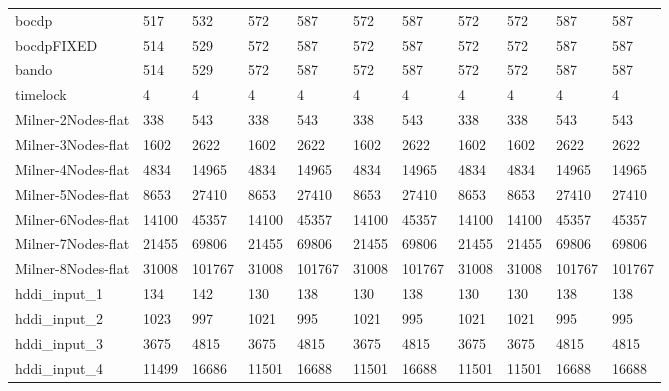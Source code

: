 \begin{table}
\begin{adjustbox}{max totalheight=\textheight}
\begin{tabular}{|l|llllllllll|}
    bocdp              & 517      & 532      & 572      & 587      & 572      & 587      & 572      & 572      & 587      & 587      \\
    bocdpFIXED         & 514      & 529      & 572      & 587      & 572      & 587      & 572      & 572      & 587      & 587      \\
    bando              & 514      & 529      & 572      & 587      & 572      & 587      & 572      & 572      & 587      & 587      \\
    timelock           & 4        & 4        & 4        & 4        & 4        & 4        & 4        & 4        & 4        & 4        \\ \hline
    Milner-2Nodes-flat & 338      & 543      & 338      & 543      & 338      & 543      & 338      & 338      & 543      & 543      \\
    Milner-3Nodes-flat & 1602     & 2622     & 1602     & 2622     & 1602     & 2622     & 1602     & 1602     & 2622     & 2622     \\
    Milner-4Nodes-flat & 4834     & 14965    & 4834     & 14965    & 4834     & 14965    & 4834     & 4834     & 14965    & 14965    \\
    Milner-5Nodes-flat & 8653     & 27410    & 8653     & 27410    & 8653     & 27410    & 8653     & 8653     & 27410    & 27410    \\
    Milner-6Nodes-flat & 14100    & 45357    & 14100    & 45357    & 14100    & 45357    & 14100    & 14100    & 45357    & 45357    \\
    Milner-7Nodes-flat & 21455    & 69806    & 21455    & 69806    & 21455    & 69806    & 21455    & 21455    & 69806    & 69806    \\
    Milner-8Nodes-flat & 31008    & 101767   & 31008    & 101767   & 31008    & 101767   & 31008    & 31008    & 101767   & 101767   \\ \hline
    hddi\_input\_1     & 134      & 142      & 130      & 138      & 130      & 138      & 130      & 130      & 138      & 138      \\
    hddi\_input\_2     & 1023     & 997      & 1021     & 995      & 1021     & 995      & 1021     & 1021     & 995      & 995      \\
    hddi\_input\_3     & 3675     & 4815     & 3675     & 4815     & 3675     & 4815     & 3675     & 3675     & 4815     & 4815     \\
    hddi\_input\_4     & 11499    & 16686    & 11501    & 16688    & 11501    & 16688    & 11501    & 11501    & 16688    & 16688    \\

\end{tabular}
\end{adjustbox}
\end{table}
